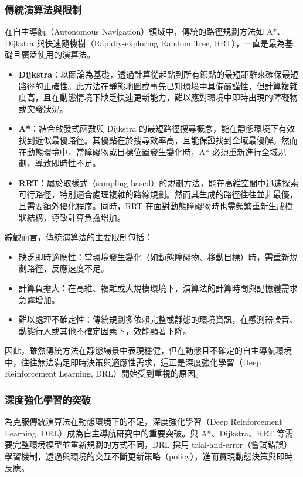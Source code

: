 \documentclass[12pt,a4paper]{ctexart}
\begin{document}
\subsubsection{傳統演算法與限制}
在自主導航（Autonomous Navigation）領域中，傳統的路徑規劃方法如 A*、Dijkstra 與快速隨機樹（Rapidly-exploring Random Tree, RRT），一直是最為基礎且廣泛使用的演算法。

\begin{itemize}
  \item \textbf{Dijkstra}：以圖論為基礎，透過計算從起點到所有節點的最短距離來確保最短路徑的正確性。此方法在靜態地圖或事先已知環境中具備嚴謹性，但計算複雜度高，且在動態情境下缺乏快速更新能力，難以應對環境中即時出現的障礙物或突發狀況。
  \item \textbf{A*}：結合啟發式函數與 Dijkstra 的最短路徑搜尋概念，能在靜態環境下有效找到近似最優路徑。其優點在於搜尋效率高，且能保證找到全域最優解。然而在動態環境中，當障礙物或目標位置發生變化時，A* 必須重新進行全域規劃，導致即時性不足。
  \item \textbf{RRT}：屬於取樣式（sampling-based）的規劃方法，能在高維空間中迅速探索可行路徑，特別適合處理複雜的路線規劃。然而其生成的路徑往往並非最優，且需要額外優化程序。同時，RRT 在面對動態障礙物時也需頻繁重新生成樹狀結構，導致計算負擔增加。
\end{itemize}

\noindent 綜觀而言，傳統演算法的主要限制包括：
\begin{itemize}
  \item 缺乏即時適應性：當環境發生變化（如動態障礙物、移動目標）時，需重新規劃路徑，反應速度不足。
  \item 計算負擔大：在高維、複雜或大規模環境下，演算法的計算時間與記憶體需求急遽增加。
  \item 難以處理不確定性：傳統規劃多依賴完整或靜態的環境資訊，在感測器噪音、動態行人或其他不確定因素下，效能顯著下降。
\end{itemize}

因此，雖然傳統方法在靜態場景中表現穩健，但在動態且不確定的自主導航環境中，往往無法滿足即時決策與適應性需求，這正是深度強化學習（Deep Reinforcement Learning, DRL）開始受到重視的原因。


\subsubsection{深度強化學習的突破}
為克服傳統演算法在動態環境下的不足，深度強化學習（Deep Reinforcement Learning, DRL）成為自主導航研究中的重要突破。與 A*、Dijkstra、RRT 等需要完整環境模型並重新規劃的方式不同，DRL 採用 trial-and-error（嘗試錯誤）學習機制，透過與環境的交互不斷更新策略（policy），進而實現動態決策與即時反應。
\end{document}
